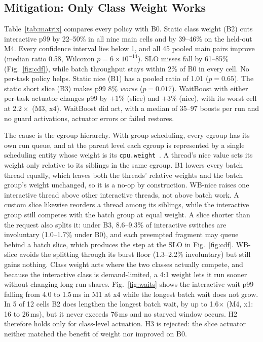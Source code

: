 \documentclass[conference]{IEEEtran}
\newcommand{\ms}{\,ms}
\newcommand{\cpuweight}{\texttt{cpu.weight}}
\begin{document}


\subsection{Mitigation: Only Class Weight Works}\label{sec:mitigation}
Table~\ref{tab:matrix} compares every policy with B0. Static class weight (B2) cuts interactive p99 by 22--50\% in all nine main cells and by 39--46\% on the held-out M4. Every confidence interval lies below 1, and all 45 pooled main pairs improve (median ratio 0.58, Wilcoxon $p=6\times10^{-14}$). SLO misses fall by 61--85\% (Fig.~\ref{fig:cdf}), while batch throughput stays within 2\% of B0 in every cell. No per-task policy helps. Static nice (B1) has a pooled ratio of 1.01 ($p=0.65$). The static short slice (B3) makes p99 8\% \emph{worse} ($p=0.017$). WaitBoost with either per-task actuator changes p99 by $+1\%$ (slice) and $+3\%$ (nice), with its worst cell at $2.2\times$ (M3, x4). WaitBoost did act, with a median of 35--97 boosts per run and no guard activations, actuator errors or failed restores.

The cause is the cgroup hierarchy. With group scheduling, every cgroup has its own run queue, and at the parent level each cgroup is represented by a single scheduling entity whose weight is its \cpuweight~\cite{kernel-cgroupv2}. A thread's nice value sets its weight only relative to its siblings in the same cgroup. B1 lowers every batch thread equally, which leaves both the threads' relative weights and the batch group's weight unchanged, so it is a no-op by construction. WB-nice raises one interactive thread above other interactive threads, not above batch work. A custom slice likewise reorders a thread among its siblings, while the interactive group still competes with the batch group at equal weight. A slice shorter than the request also splits it: under B3, 8.6--9.3\% of interactive switches are involuntary (1.0--1.7\% under B0), and each preempted fragment may queue behind a batch slice, which produces the step at the SLO in Fig.~\ref{fig:cdf}. WB-slice avoids the splitting through its burst floor (1.3--2.2\% involuntary) but still gains nothing. Class weight acts where the two classes actually compete, and because the interactive class is demand-limited, a 4:1 weight lets it run sooner without changing long-run shares. Fig.~\ref{fig:waits} shows the interactive wait p99 falling from 4.0 to 1.5\ms{} in M1 at x4 while the longest batch wait does not grow. In 5 of 12 cells B2 does lengthen the longest batch wait, by up to 1.6$\times$ (M4, x1: 16 to 26\ms), but it never exceeds 76\ms{} and no starved window occurs. H2 therefore holds only for class-level actuation. H3 is rejected: the slice actuator neither matched the benefit of weight nor improved on B0.
\end{document}
